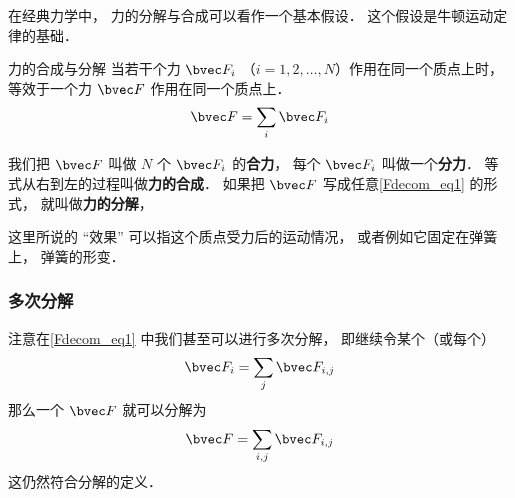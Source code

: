 

在经典力学中， 力的分解与合成可以看作一个基本假设． 这个假设是牛顿运动定律的基础．

\begin{theorem}{力的合成与分解}
当若干个力 $\bvec F_i$ （$i = 1, 2, \dots, N$）作用在同一个质点上时， 等效于一个力 $\bvec F$ 作用在同一个质点上．
\begin{equation}\label{Fdecom_eq1}
\bvec F = \sum_i \bvec F_i
\end{equation}
\end{theorem}
我们把 $\bvec F$ 叫做 $N$ 个 $\bvec F_i$ 的\textbf{合力}， 每个 $\bvec F_i$ 叫做一个\textbf{分力}． 等式从右到左的过程叫做\textbf{力的合成}． 如果把 $\bvec F$ 写成任意\autoref{Fdecom_eq1} 的形式， 就叫做\textbf{力的分解}， 

这里所说的 “效果” 可以指这个质点受力后的运动情况， 或者例如它固定在弹簧上， 弹簧的形变．

\subsubsection{多次分解}
注意在\autoref{Fdecom_eq1} 中我们甚至可以进行多次分解， 即继续令某个（或每个）
\begin{equation}
\bvec F_i = \sum_j \bvec F_{i,j}
\end{equation}
那么一个 $\bvec F$ 就可以分解为
\begin{equation}
\bvec F = \sum_{i,j} \bvec F_{i,j}
\end{equation}
这仍然符合分解的定义．
